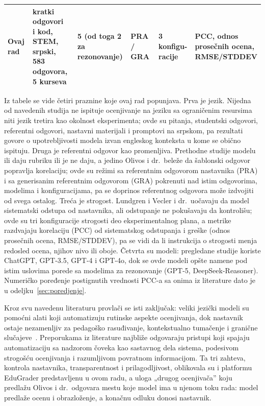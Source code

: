 \begin{table}[ht]
\begin{tabular}{@{}llllll@{}}
\midrule
Ovaj rad & \makecell[l]{kratki odgovori\\i kod, STEM, srpski,\\583 odgovora,\\5 kurseva} & \makecell[l]{5 (od toga 2\\za rezonovanje)} & PRA / GRA & \makecell[l]{3 konfigu-\\racije} & \makecell[l]{PCC, odnos\\prosečnih ocena,\\RMSE/STDDEV} \\
\bottomrule
\end{tabular}
\end{table}

Iz tabele se vide četiri praznine koje ovaj rad popunjava.
Prva je jezik.
Nijedna od navedenih studija ne ispituje ocenjivanje na jeziku sa ograničenim resursima niti jezik tretira kao okolnost eksperimenta;
ovde su pitanja, studentski odgovori, referentni odgovori, nastavni materijali i promptovi na srpskom,
pa rezultati govore o upotrebljivosti modela izvan engleskog konteksta u kome se obično ispituju.
Druga je referentni odgovor kao promenljiva.
Prethodne studije modelu ili daju rubriku ili je ne daju, a jedino Olivos i dr.\ beleže da šablonski odgovor popravlja korelaciju;
ovde su režimi sa referentnim odgovorom nastavnika (PRA) i sa generisanim referentnim odgovorom (GRA)
pokrenuti nad istim odgovorima, modelima i konfiguracijama,
pa se doprinos referentnog odgovora može izdvojiti od svega ostalog.
Treća je strogost.
Lundgren i \mbox{Vecler} i dr.\ uočavaju da model sistematski odstupa od nastavnika, ali odstupanje ne pokušavaju da kontrolišu;
ovde su tri konfiguracije strogosti deo eksperimentalnog plana,
a metrike razdvajaju korelaciju (PCC) od sistematskog odstupanja i greške (odnos prosečnih ocena, RMSE/STDDEV),
pa se vidi da li instrukcija o strogosti menja redosled ocena, njihov nivo ili oboje.
Četvrta su modeli: pregledane studije koriste ChatGPT, GPT-3.5, GPT-4 i GPT-4o,
dok se ovde modeli opšte namene pod istim uslovima porede sa modelima za rezonovanje (GPT-5, DeepSeek-Reasoner).
Numeričko poređenje postignutih vrednosti PCC-a sa onima iz literature dato je u odeljku~\ref{sec:poredjenje}.

Kroz svu navedenu literaturu provlači se isti zaključak: veliki jezički modeli su pomoćni alati koji automatizuju rutinske aspekte ocenjivanja,
dok nastavnik ostaje nezamenljiv za pedagoško rasuđivanje,
kontekstualno tumačenje i granične slučajeve~\cite{swiecki2022assessment,zawacki2019systematic}.
Preporukama iz literature najbliže odgovaraju pristupi koji spajaju automatizaciju sa nadzorom čoveka kao sastavnog dela sistema,
podesivom strogošću ocenjivanja i razumljivom povratnom informacijom.
Ta tri zahteva, kontrola nastavnika, transparentnost i prilagodljivost, oblikovala su i platformu EduGrader predstavljenu u ovom radu,
a uloga „drugog ocenjivača'' koju predlažu Olivos i dr.\ odgovara mestu koje model ima u njenom toku rada:
model predlaže ocenu i obrazloženje, a konačnu odluku donosi nastavnik.
